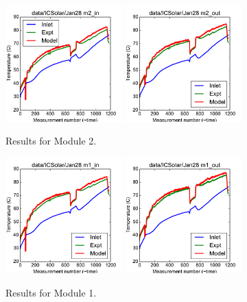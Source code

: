 \documentclass{article}
\begin{document}
\clearpage
\begin{figure}[!ht]
\centering
\includegraphics[width=0.4\textwidth]{../../data/ICSolar/images/Jan28_m2_in.pdf}\hspace{0.05\textwidth}
\includegraphics[width=0.4\textwidth]{../../data/ICSolar/images/Jan28_m2_out.pdf}\hspace{0.05\textwidth}\\
\caption{Results for Module 2.}\end{figure}
\begin{figure}[!ht]
\centering
\includegraphics[width=0.4\textwidth]{../../data/ICSolar/images/Jan28_m1_in.pdf}\hspace{0.05\textwidth}
\includegraphics[width=0.4\textwidth]{../../data/ICSolar/images/Jan28_m1_out.pdf}\hspace{0.05\textwidth}\\
\caption{Results for Module 1.}\end{figure}
\end{document}
